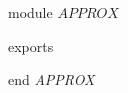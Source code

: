 {\small\sf module} $APPROX$
\begin{interface}{exports}
\end{interface}
\kDefinitions
\kValues
{}
{\small\sf end} {\it APPROX} \\
